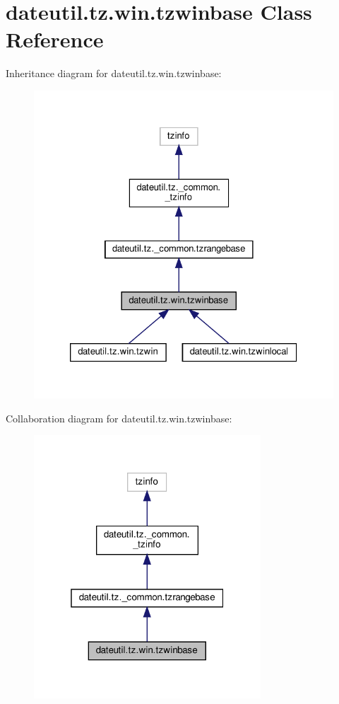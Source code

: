 \hypertarget{classdateutil_1_1tz_1_1win_1_1tzwinbase}{}\section{dateutil.\+tz.\+win.\+tzwinbase Class Reference}
\label{classdateutil_1_1tz_1_1win_1_1tzwinbase}


Inheritance diagram for dateutil.\+tz.\+win.\+tzwinbase\+:
\nopagebreak
\begin{figure}[H]
\begin{center}
\leavevmode
\includegraphics[width=326pt]{classdateutil_1_1tz_1_1win_1_1tzwinbase__inherit__graph}
\end{center}
\end{figure}


Collaboration diagram for dateutil.\+tz.\+win.\+tzwinbase\+:
\nopagebreak
\begin{figure}[H]
\begin{center}
\leavevmode
\includegraphics[width=241pt]{classdateutil_1_1tz_1_1win_1_1tzwinbase__coll__graph}
\end{center}
\end{figure}

